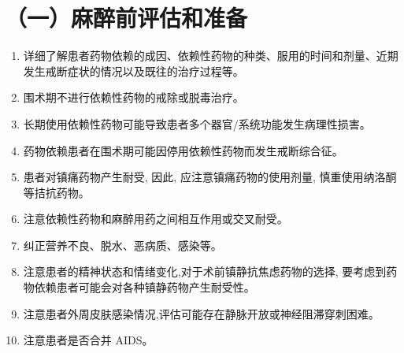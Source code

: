 \documentclass[10pt]{article}
\begin{document}
\section*{（一）麻醉前评估和准备}
\begin{enumerate}
  \item 详细了解患者药物依赖的成因、依赖性药物的种类、服用的时间和剂量、近期发生戒断症状的情况以及既往的治疗过程等。

  \item 围术期不进行依赖性药物的戒除或脱毒治疗。

  \item 长期使用依赖性药物可能导致患者多个器官/系统功能发生病理性损害。

  \item 药物依赖患者在围术期可能因停用依赖性药物而发生戒断综合征。

  \item 患者对镇痛药物产生耐受, 因此, 应注意镇痛药物的使用剂量, 慎重使用纳洛酮等拮抗药物。

  \item 注意依赖性药物和麻醉用药之间相互作用或交叉耐受。

  \item 纠正营养不良、脱水、恶病质、感染等。

  \item 注意患者的精神状态和情绪变化,对于术前镇静抗焦虑药物的选择, 要考虑到药物依赖患者可能会对各种镇静药物产生耐受性。

  \item 注意患者外周皮肤感染情况,评估可能存在静脉开放或神经阻滞穿刺困难。

  \item 注意患者是否合并 AIDS。

\end{enumerate}
\end{document}
